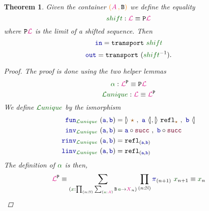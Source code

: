 \documentclass[twoside,11pt,openright]{report}
\theoremstyle{plain} %
\newtheorem{thm}{Theorem}[section]
\theoremstyle{definition}
\theoremstyle{remark}
\newcommand*{\term}[1]{\textcolor{green!30!black}{#1}} %
\newcommand*{\pathterm}[1]{\textcolor{green!40!black}{#1}}
\newcommand*{\type}[1]{\textcolor{magenta!90!black}{#1}}
\newcommand*{\containerpair}[2]{\ensuremath{\colorlet{savedleftcolor}{.}\color{orange}\left(\color{savedleftcolor}#1\,\textcolor{orange}{\mathbf{,}}\,#2\color{orange}\right)\color{savedleftcolor}}}
\newcommand*{\constant}[1]{\textcolor{orange!60!black}{\ensuremath{\mathtt{#1}}}}
\newcommand*{\function}[1]{\textcolor{blue!60!black}{\ensuremath{\mathtt{#1}}}}
\newcommand*{\constructor}[1]{\textcolor{purple!60!black}{\ensuremath{\mathtt{#1}}}}
\newcommand*{\typeformer}[1]{\ensuremath{\mathtt{#1}}}
\newcommand*{\functor}[1]{\ensuremath{\mathbf{\mathtt{#1}}}}
\newcommand*{\unitelem}{\constant{\star}} %
\newcommand*{\natcases}[2]{\ensuremath{\mathbb{[\hspace{-.5mm}\rangle}~\ensuremath{#1}~,~\ensuremath{#2}~\mathbb{\langle\hspace{-.5mm}]}}}
\newcommand*{\sym}[1]{\ensuremath{#1^{-1}}}
\begin{document}
\begin{thm}
  \label{thm:M-shift}
   Given the container \(\containerpair{\type{A}}{\typeformer{B}}\) we define the equality
  \begin{equation}
    \pathterm{shift} : \type{\mathcal{L}} \equiv \functor{P}\type{\mathcal{L}}
  \end{equation}
  where \(\functor{P}\type{\mathcal{L}}\) is the limit of a shifted sequence. Then
  \begin{equation}
    \function{in} = \mathtt{transport}~\pathterm{shift}
  \end{equation}
  \begin{equation}
    \function{out} = \mathtt{transport}~(\sym{\pathterm{shift}}).
  \end{equation}
  \begin{proof}
    The proof is done using the two helper lemmas
    \begin{equation}
      \pathterm{\alpha} : \type{\mathcal{L}}^{\functor{P}} \equiv \functor{P}\type{\mathcal{L}}
    \end{equation}
    \begin{equation}
      \pathterm{\mathcal{L}unique} : \type{\mathcal{L}} \equiv \type{\mathcal{L}}^{\functor{P}}
    \end{equation}
    We define \(\pathterm{\mathcal{L}unique}\) by the ismorphism
    \begin{align}
      \function{fun}_{\pathterm{\mathcal{L}unique}}~(\function{a} , \function{b}) &= \natcases{\unitelem}{\function{a}} , \natcases{\mathtt{refl}_{\unitelem}}{\function{b}} \\
    \function{inv}_{\pathterm{\mathcal{L}unique}}~(\function{a} , \function{b}) &= \function{a} \circ \constructor{succ}~,~\function{b} \circ \constructor{succ} \\
    \function{rinv}_{\pathterm{\mathcal{L}unique}}~(\function{a} , \function{b}) &= \mathtt{refl}_{(\function{a},\function{b})} \\
    \function{linv}_{\pathterm{\mathcal{L}unique}}~(\function{a} , \function{b}) &= \mathtt{refl}_{(\function{a},\function{b})}
    \end{align}
    The definition of \(\pathterm{\alpha}\) is then, 
    \begin{align}
      \type{\mathcal{L}}^{\functor{P}} &\equiv \sum_{(\term{x} : \prod_{(n : \mathbb{N})} \sum_{(\term{a} : \type{A})} \typeformer{B}\,\term{a} \rightarrow \type{X}_n)} \prod_{(n : \mathbb{N})} \function{\pi}_{(n+1)}~\term{x}_{n+1} \equiv \term{x}_{n} \\

\end{align}
\end{proof}
\end{thm}
\end{document}
